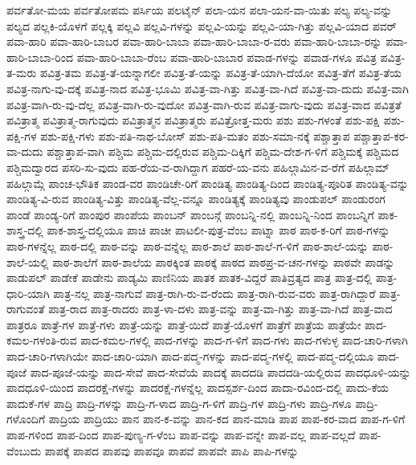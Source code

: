 {ಪರ್ವತೋ-ಮಯ
ಪರ್ವತೋಪಮ
ಪರ್ಸಿಯ
ಪಲಟೈನ್
ಪಲಾ-ಯನ
ಪಲಾ-ಯನ-ವಾ-ಯಿತು
ಪಲ್ಯ
ಪಲ್ಯ-ವನ್ನು
ಪಲ್ಯದ
ಪಲ್ಲಕಿ-ಯೊಳಗೆ
ಪಲ್ಲಕ್ಕಿ
ಪಲ್ಲವಿ
ಪಲ್ಲವಿ-ಗಳನ್ನು
ಪಲ್ಲವಿ-ಯನ್ನು
ಪಲ್ಲವಿ-ಯಾ-ಗಿತ್ತು
ಪಲ್ಲವಿ-ಯಾದ
ಪವರ್
ಪವಾ-ಹಾರಿ
ಪವಾ-ಹಾರಿ-ಬಾಬರ
ಪವಾ-ಹಾರಿ-ಬಾಬಾ
ಪವಾ-ಹಾರಿ-ಬಾಬಾ-ರ-ವರು
ಪವಾ-ಹಾರಿ-ಬಾಬಾ-ರನ್ನು
ಪವಾ-ಹಾರಿ-ಬಾಬಾ-ರಿಂದ
ಪವಾ-ಹಾರಿ-ಬಾಬಾ-ರೆಂಬ
ಪವಾ-ಹಾರಿ-ಬಾಬಾರ
ಪವಾಡ-ಗಳನ್ನು
ಪವಾಡ-ಗಳೂ
ಪವಿತ್ರ
ಪವಿತ್ರ-ತ-ಮರು
ಪವಿತ್ರ-ತಮ
ಪವಿತ್ರ-ತೆ-ಯನ್ನಾಗಲೀ
ಪವಿತ್ರ-ತೆ-ಯನ್ನು
ಪವಿತ್ರ-ತೆ-ಯಾಗಿ-ದೆಯೋ
ಪವಿತ್ರ-ತೆಗೆ
ಪವಿತ್ರ-ತೆಯ
ಪವಿತ್ರ-ನಾಗು-ವು-ದಕ್ಕೆ
ಪವಿತ್ರ-ನಾದ
ಪವಿತ್ರ-ಭೂಮಿ
ಪವಿತ್ರ-ವಾ-ಗಿತ್ತು
ಪವಿತ್ರ-ವಾ-ಗಿದೆ
ಪವಿತ್ರ-ವಾ-ದುದು
ಪವಿತ್ರ-ವಾಗಿ
ಪವಿತ್ರ-ವಾಗಿ-ರು-ವು-ದೆಲ್ಲ
ಪವಿತ್ರ-ವಾಗಿ-ರು-ವುದೋ
ಪವಿತ್ರ-ವಾಗಿ-ರುವ
ಪವಿತ್ರ-ವಾಗು-ವುದು
ಪವಿತ್ರ-ವಾದ
ಪವಿತ್ರತೆ
ಪವಿತ್ರಾತ್ಮ
ಪವಿತ್ರಾತ್ಮ-ರಾಗುವುದು
ಪವಿತ್ರಾತ್ಮನ
ಪವಿತ್ರಾತ್ಮರು
ಪವಿತ್ರೋತ್ತ-ಮರು
ಪಶು
ಪಶು-ಗಳಂತೆ
ಪಶು-ಪಕ್ಷಿ
ಪಶು-ಪಕ್ಷಿ-ಗಳ
ಪಶು-ಪಕ್ಷಿ-ಗಳು
ಪಶು-ಪತಿ-ನಾಥ-ಬೋಸ್
ಪಶು-ಪತಿ-ಮತಂ
ಪಶು-ಸಮಾ-ನಕ್ಕೆ
ಪಶ್ಚಾತ್ತಾಪ
ಪಶ್ಚಾತ್ತಾಪ-ಕರ-ವಾ-ದುದು
ಪಶ್ಚಾತ್ತಾಪ-ವಾಗಿ
ಪಶ್ಚಿಮ
ಪಶ್ಚಿಮ-ದಲ್ಲಿರುವ
ಪಶ್ಚಿಮ-ದಿಕ್ಕಿಗೆ
ಪಶ್ಚಿಮ-ದೇಶ-ಗ-ಳಿಗೆ
ಪಶ್ಚಿಮಕ್ಕೆ
ಪಶ್ಚಿಮದ
ಪಶ್ಚಿಮದ್ವಾರದ
ಪಸರಿ-ಸು-ವುದು
ಪಹ-ರೆಯ-ವ-ರಾಗಿದ್ದಾಗ
ಪಹರೆ-ಯ-ವನು
ಪಹಿಲ್ಗಾಮಿನ-ವ-ರೆಗೆ
ಪಹಿಲ್ಗಾಮ್
ಪಹಿಲ್ಗಾಮ್ಗೆ
ಪಾಂಚ-ಭೌತಿಕ
ಪಾಂಡ-ವರ
ಪಾಂಡಿಚೇ-ರಿಗೆ
ಪಾಂಡಿತ್ಯ
ಪಾಂಡಿತ್ಯ-ದಿಂದ
ಪಾಂಡಿತ್ಯ-ಪೂರಿತ
ಪಾಂಡಿತ್ಯ-ವನ್ನು
ಪಾಂಡಿತ್ಯ-ವಿ-ರುವ
ಪಾಂಡಿತ್ಯ-ವಿತ್ತು
ಪಾಂಡಿತ್ಯ-ವೆಲ್ಲ-ವನ್ನೂ
ಪಾಂಡಿತ್ಯಕ್ಕೆ
ಪಾಂಡಿತ್ಯವು
ಪಾಂಡುಪಲ್
ಪಾಂಡುರಂಗ
ಪಾಂಡೆ
ಪಾಂಡ್ಯ-ರಿಗೆ
ಪಾಂಪುರ
ಪಾಂಪೆಯ
ಪಾಂಬನ್
ಪಾಂಬನ್ಗೆ
ಪಾಂಬನ್ನಿ-ನಲ್ಲಿ
ಪಾಂಬನ್ನಿ-ನಿಂದ
ಪಾಂಬನ್ನಿಗೆ
ಪಾಕ-ಶಾಸ್ತ್ರ-ದಲ್ಲಿ
ಪಾಕ-ಶಾಸ್ತ್ರ-ದಲ್ಲಿಯೂ
ಪಾಚಿ
ಪಾಚೀ
ಪಾಟಲೀ-ಪುತ್ರ-ವೆಂಬ
ಪಾಟ್ನಾ
ಪಾಠ
ಪಾಠ-ಕ-ರಿಗೆ
ಪಾಠ-ಗಳನ್ನು
ಪಾಠ-ಗಳನ್ನೆಲ್ಲ
ಪಾಠ-ದಲ್ಲಿ
ಪಾಠ-ವನ್ನು
ಪಾಠ-ವನ್ನೆಲ್ಲ
ಪಾಠ-ಶಾಲೆ
ಪಾಠ-ಶಾಲೆ-ಗ-ಳಿಗೆ
ಪಾಠ-ಶಾಲೆ-ಯನ್ನು
ಪಾಠ-ಶಾಲೆ-ಯಲ್ಲಿ
ಪಾಠ-ಶಾಲೆಗೆ
ಪಾಠ-ಶಾಲೆಯ
ಪಾಠಕ್ಕಿಂತ
ಪಾಠಕ್ಕೆ
ಪಾಠದ
ಪಾಠಪ್ರ-ವ-ಚನ-ಗಳನ್ನು
ಪಾಠವೇ
ಪಾಡನ್ನು
ಪಾಡುಪಲ್
ಪಾಡೇಕೆ
ಪಾಡೇನು
ಪಾಡ್ಯಮಿ
ಪಾಣಿನಿಯ
ಪಾತಕ
ಪಾತಕ-ವಿದ್ದರೆ
ಪಾತಿವ್ರತ್ಯದ
ಪಾತ್ರ
ಪಾತ್ರ-ದಲ್ಲಿ
ಪಾತ್ರ-ಧಾರಿ-ಯಾಗಿ
ಪಾತ್ರ-ನಲ್ಲ
ಪಾತ್ರ-ನಾಗುವೆ
ಪಾತ್ರ-ರಾಗಿ-ರು-ವ-ರೆಂದು
ಪಾತ್ರ-ರಾಗಿ-ರುವ-ವರು
ಪಾತ್ರ-ರಾಗಿದ್ದಾರೆ
ಪಾತ್ರ-ರಾಗುವಂತೆ
ಪಾತ್ರ-ರಾದ
ಪಾತ್ರ-ರಾದರು
ಪಾತ್ರ-ಳಾ-ದಳು
ಪಾತ್ರ-ವನ್ನು
ಪಾತ್ರ-ವಾ-ಗಿತ್ತು
ಪಾತ್ರ-ವಾ-ಗಿದೆ
ಪಾತ್ರ-ವಾದ
ಪಾತ್ರರೂ
ಪಾತ್ರೆ-ಗಳ
ಪಾತ್ರೆ-ಗಳು
ಪಾತ್ರೆ-ಯನ್ನು
ಪಾತ್ರೆ-ಯಿದೆ
ಪಾತ್ರೆ-ಯೊಳಗೆ
ಪಾತ್ರೆಗೆ
ಪಾತ್ರೆಯ
ಪಾತ್ರೆಯೇ
ಪಾದ-ಕಮಲ-ಗಳಂತಿ-ರುವ
ಪಾದ-ಕಮಲ-ಗಳಲ್ಲಿ
ಪಾದ-ಗಳನ್ನು
ಪಾದ-ಗ-ಳಿಗೆ
ಪಾದ-ಗಳು
ಪಾದ-ಗಳುಳ್ಳ
ಪಾದ-ಚಾರಿ-ಗಳಾಗಿ
ಪಾದ-ಚಾರಿ-ಗಳಾಗಿಯೇ
ಪಾದ-ಚಾರಿ-ಯಾಗಿ
ಪಾದ-ಪದ್ಮ-ಗಳನ್ನು
ಪಾದ-ಪದ್ಮ-ಗಳಲ್ಲಿ
ಪಾದ-ಪದ್ಮ-ದಲ್ಲಿಯೂ
ಪಾದ-ಪೂಜೆ
ಪಾದ-ಪೂಜೆ-ಯನ್ನು
ಪಾದ-ಸೇವೆ
ಪಾದ-ಸೇವೆಯೆ
ಪಾದಕ್ಕೆ
ಪಾದದಡಿ
ಪಾದದಡಿ-ಯಲ್ಲಿರುವ
ಪಾದಧೂಳಿ-ಯನ್ನು
ಪಾದಧೂಳಿ-ಯಿಂದ
ಪಾದರಕ್ಷೆ-ಗಳನ್ನು
ಪಾದರಕ್ಷೆ-ಗಳನ್ನೆಲ್ಲ
ಪಾದಸ್ಪರ್ಶ-ದಿಂದ
ಪಾದಾ-ರವಿಂದ-ದಲ್ಲಿ
ಪಾದು-ಕೆಯ
ಪಾದುಕೆ-ಗಳ
ಪಾದ್ರಿ
ಪಾದ್ರಿ-ಗಳನ್ನು
ಪಾದ್ರಿ-ಗ-ಳಾದ
ಪಾದ್ರಿ-ಗ-ಳಿಗೆ
ಪಾದ್ರಿ-ಗಳ
ಪಾದ್ರಿ-ಗಳು
ಪಾದ್ರಿ-ಗಳೂ
ಪಾದ್ರಿ-ಗಳೊಂದಿಗೆ
ಪಾದ್ರಿಯ
ಪಾದ್ರಿಯು
ಪಾನ
ಪಾನ-ಕ-ವನ್ನು
ಪಾನ-ಕದ
ಪಾನ-ಮಾಡಿ
ಪಾಪ
ಪಾಪ-ಕರ-ವಾದ
ಪಾಪ-ಗ-ಳಿಗೆ
ಪಾಪ-ಗಳಿಂದ
ಪಾಪ-ದಿಂದ
ಪಾಪ-ಪುಣ್ಯ-ಗ-ಳೆಂಬ
ಪಾಪ-ವನ್ನು
ಪಾಪ-ವನ್ನೇ
ಪಾಪ-ವಲ್ಲ
ಪಾಪ-ವಲ್ಲದೆ
ಪಾಪ-ವೆಂಬುದು
ಪಾಪಕ್ಕೆ
ಪಾಪದ
ಪಾಪವು
ಪಾಪವೂ
ಪಾಪವೆ
ಪಾಪವೇ
ಪಾಪಿ
ಪಾಪಿ-ಗಳನ್ನು
}
